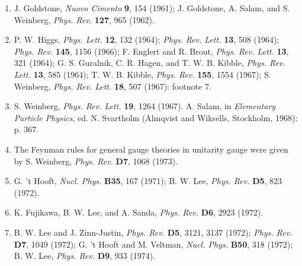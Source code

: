 


\begin{enumerate}
\item {}\label{ch21-ref-1}
J. Goldstone, \emph{Nuovo Cimento} \textbf{9}, 154 (1961); J. Goldstone,
A. Salam, and S. Weinberg, \emph{Phys. Rev.} \textbf{127}, 965 (1962).

\item {}\label{ch21-ref-2}
P. W. Higgs, \emph{Phys. Lett.} \textbf{12}, 132 (1964);
\emph{Phys. Rev. Lett.} \textbf{13}, 508 (1964);
\emph{Phys. Rev.} \textbf{145}, 1156 (1966); F. Englert and R. Brout,
\emph{Phys. Rev. Lett.} \textbf{13}, 321 (1964); G. S. Guralnik,
C. R. Hagen, and T. W. B. Kibble, \emph{Phys. Rev. Lett.} \textbf{13},
585 (1964); T. W. B. Kibble, \emph{Phys. Rev.} \textbf{155}, 1554
(1967); S. Weinberg, \emph{Phys. Rev. Lett.} \textbf{18}, 507 (1967):
footnote 7.

\item {}\label{ch21-ref-3}
S. Weinberg, \emph{Phys. Rev. Lett.} \textbf{19}, 1264 (1967). A. Salam,
in \emph{Elementary Particle Physics}, ed. N. Svartholm (Almqvist and
Wiksells, Stockholm, 1968): p. 367.

\item[3a.] \label{ch21-ref-3a}
The Feynman rules for general gauge theories in unitarity gauge were given
by S. Weinberg, \emph{Phys. Rev.} \textbf{D7}, 1068 (1973).

\item {}\label{ch21-ref-4}
G. 't Hooft, \emph{Nucl. Phys.} \textbf{B35}, 167 (1971); B. W. Lee,
\emph{Phys. Rev.} \textbf{D5}, 823 (1972).

\item {}\label{ch21-ref-5}
K. Fujikawa, B. W. Lee, and A. Sanda, \emph{Phys. Rev.} \textbf{D6},
2923 (1972).

\item[5a.] \label{ch21-ref-5a}
B. W. Lee and J. Zinn-Justin, \emph{Phys. Rev.} \textbf{D5}, 3121, 3137
(1972); \emph{Phys. Rev.} \textbf{D7}, 1049 (1972); G. 't Hooft and
M. Veltman, \emph{Nucl. Phys.} \textbf{B50}, 318 (1972); B. W. Lee,
\emph{Phys. Rev.} \textbf{D9}, 933 (1974).


\end{enumerate}
